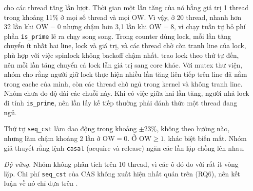  cho các thread tăng lần lượt. Thời gian một lần tăng của nó bằng giá trị 1 thread
trong khoảng 11\% ở mọi số thread và mọi $\mathrm{OW}$. Vì vậy, ở 20 thread,  nhanh hơn
 32 lần khi $\mathrm{OW} = 0$ nhưng chậm hơn 3,1 lần khi $\mathrm{OW} = 8$, vì chạy tuần tự
bỏ phí phần \texttt{is\_prime} lẽ ra chạy song song. Trong counter dùng lock, mỗi lần tăng chuyển ít nhất
hai line, lock và giá trị, và các thread chờ còn tranh line của lock, phù hợp với việc spinlock không
backoff chậm nhất.  trao lock theo thứ tự đến, nên mỗi lần tăng chuyển cả lock lẫn giá
trị sang core khác. Với mutex thư viện, nhóm cho rằng người giữ lock thực hiện nhiều lần tăng liên tiếp
trên line đã nằm trong cache của mình, còn các thread chờ ngủ trong kernel và không tranh line. Nhóm chưa
đo độ dài các chuỗi này. Khi có việc giữa hai lần tăng, người nhả lock đi tính \texttt{is\_prime}, nên
lần lấy kế tiếp thường phải đánh thức một thread đang ngủ.

Thứ tự \texttt{seq\_cst} làm  dao động trong khoảng $\pm 23\%$, không theo hướng nào, nhưng
làm  chậm khoảng 2 lần ở $\mathrm{OW} = 0$. Ở $\mathrm{OW} \ge 1$, khác biệt biến mất. Nhóm
giả thuyết rằng lệnh \texttt{casal} (acquire và release) ngăn các lần lặp chồng lên nhau.

\emph{Độ vững.} Nhóm không phân tích  trên 10 thread, vì các ô đó đo với rất ít vòng
lặp. Chi phí \texttt{seq\_cst} của CAS không xuất hiện nhất quán trên  (RQ6), nên kết
luận về nó chỉ dựa trên .
